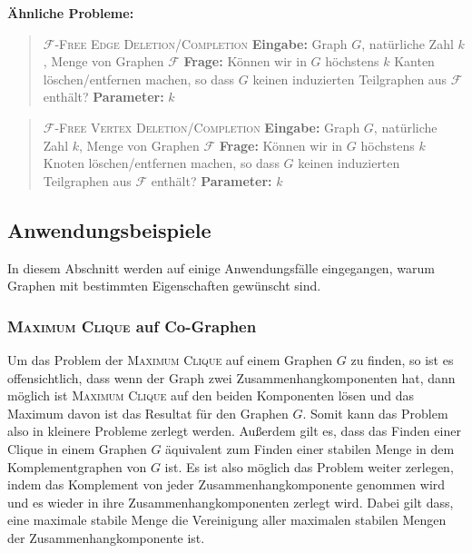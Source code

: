 \documentclass[12pt,a4paper,onecolumn,oneside,titlepage]{article}
\newcommand\cursive[1]{\ensuremath{\mathcal{#1}}}
\begin{document}
\textbf{Ähnliche Probleme:}

\begin{quote}
  \textsc{\cursive{F}-Free Edge Deletion/Completion}\newline
  \textbf{Eingabe:} Graph $G$, natürliche Zahl $k$, Menge von Graphen \cursive{F}\newline
  \textbf{Frage:} Können wir in $G$ höchstens $k$ Kanten löschen/entfernen  machen, so dass $G$ keinen induzierten Teilgraphen aus \cursive{F} enthält?\newline
  \textbf{Parameter:} $k$
\end{quote}

\begin{quote}
  \textsc{\cursive{F}-Free Vertex Deletion/Completion}\newline
  \textbf{Eingabe:} Graph $G$, natürliche Zahl $k$, Menge von Graphen \cursive{F}\newline
  \textbf{Frage:} Können wir in $G$ höchstens $k$ Knoten löschen/entfernen  machen, so dass $G$ keinen induzierten Teilgraphen aus \cursive{F} enthält?\newline
  \textbf{Parameter:} $k$
\end{quote}

\subsection{Anwendungsbeispiele}
\label{sec:examples}
In diesem Abschnitt werden auf einige Anwendungsfälle eingegangen, warum Graphen mit bestimmten Eigenschaften gewünscht sind.
\subsubsection{\textsc{Maximum Clique} auf Co-Graphen}
Um das Problem der \textsc{Maximum Clique} auf einem Graphen $G$ zu finden, so ist es offensichtlich, dass wenn der Graph zwei Zusammenhangkomponenten hat, dann möglich ist \textsc{Maximum Clique} auf den beiden Komponenten lösen und das Maximum davon ist das Resultat für den Graphen $G$. Somit kann das Problem also in kleinere Probleme zerlegt werden.
Außerdem gilt es, dass das Finden einer Clique in einem Graphen $G$ äquivalent zum Finden einer stabilen Menge in dem Komplementgraphen von $G$ ist.
Es ist also möglich das Problem weiter zerlegen, indem das Komplement von jeder Zusammenhangkomponente genommen wird und es wieder in ihre Zusammenhangkomponenten zerlegt wird. Dabei gilt dass, eine maximale stabile Menge die Vereinigung aller maximalen stabilen Mengen der Zusammenhangkomponente ist.
\end{document}
